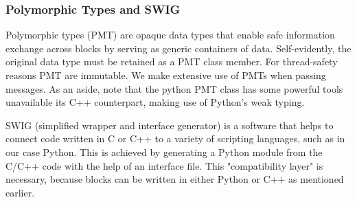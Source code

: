 \subsubsection{Polymorphic Types and SWIG} 

Polymorphic types (PMT) are opaque data types that enable safe information exchange across blocks by serving as generic containers of data. Self-evidently, the original data type must be retained as a PMT class member. For thread-safety reasons PMT are immutable. We make extensive use of PMTs when passing messages. As an aside, note that the python PMT class has some powerful tools unavailable its C++ counterpart, making use of Python's weak typing.

SWIG (simplified wrapper and interface generator) is a software that helps to connect code written in C or C++ to a variety of scripting languages, such as in our case Python. This is achieved by generating a Python module from the C/C++ code with the help of an interface file. This "compatibility layer" is necessary, because blocks can be written in either Python or C++ as mentioned earlier.